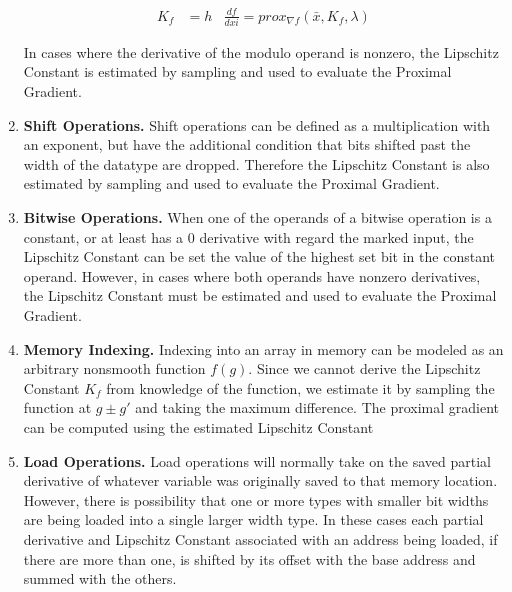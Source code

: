 \begin{enumerate}
\vspace{-10pt}\begin{align*}
  K_f &= h &
  \frac{df}{dxi} = prox_{\nabla f}\left(\bar{x}, K_f, \lambda\right)
\end{align*}

In cases where the derivative of the modulo operand is nonzero, the Lipschitz Constant is estimated by sampling and used to evaluate the Proximal Gradient. 


\item \textbf{Shift Operations.} Shift operations can be defined as a multiplication with an exponent, but have the additional condition that bits shifted past the width of the datatype are dropped. Therefore the Lipschitz Constant is also estimated by sampling and used to evaluate the Proximal Gradient.



\item \textbf{Bitwise Operations.} When one of the operands of a bitwise operation is a constant, or at least has a 0 derivative with regard the marked input, the Lipschitz Constant can be set the value of the highest set bit in the constant operand. However, in cases where both operands have nonzero derivatives, the Lipschitz Constant must be estimated and used to evaluate the Proximal Gradient. 


\item \textbf{Memory Indexing.} Indexing into an array in memory can be modeled as an arbitrary nonsmooth function $f\left(g\right)$. Since we cannot derive the Lipschitz Constant $K_f$ from knowledge of the function, we estimate it by sampling the function at $g \pm g'$ and taking the maximum difference. The proximal gradient can be computed using the estimated Lipschitz Constant


\item \textbf{Load Operations.} Load operations will normally take on the saved partial derivative of whatever variable was originally saved to that memory location. However, there is possibility that one or more types with smaller bit widths are being loaded into a single larger width type. In these cases each partial derivative and Lipschitz Constant associated with an address being loaded, if there are more than one, is shifted by its offset with the base address and summed with the others.


\end{enumerate}
